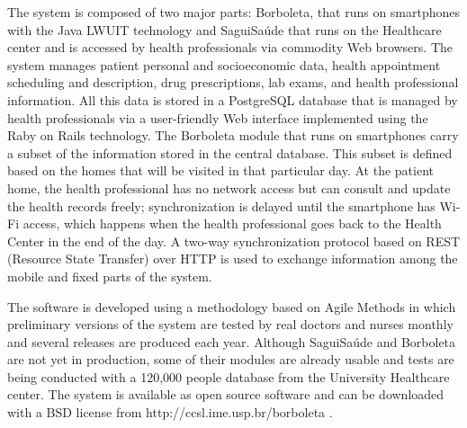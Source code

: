\documentclass[12pt]{article}
\begin{document}
The system is composed of two major parts: Borboleta, that runs on smartphones with the Java LWUIT
technology and SaguiSaúde that runs on the Healthcare center and is accessed by health professionals
via commodity Web browsers.
The system manages patient personal and socioeconomic data, health appointment
scheduling and description, drug prescriptions, lab exams, and health professional
information. All this data is stored in a PostgreSQL database that is managed by health
professionals via a user-friendly Web interface implemented using the Raby on Rails technology.
The Borboleta module that runs on smartphones carry a subset of the information stored in the central database.
This subset is defined based on the homes that will be visited in that particular day. At the patient home,
the health professional has no network access but can consult and update the health records freely;
synchronization is delayed until the smartphone has Wi-Fi access, which happens when the health professional
goes back to the Health Center in the end of the day. A two-way synchronization protocol based on REST
(Resource State Transfer) over HTTP is used to exchange information among the mobile and fixed parts of the system.

The software is developed using a methodology based on Agile Methods in which preliminary versions of the system
are tested by real doctors and nurses monthly and several releases are produced each year. Although SaguiSaúde
and Borboleta are not yet in production, some of their modules are already usable and tests are being conducted
with a 120,000 people database from the University Healthcare center. The system is available as open source
software and can be downloaded with a BSD license from http://ccsl.ime.usp.br/borboleta .




\end{document}
